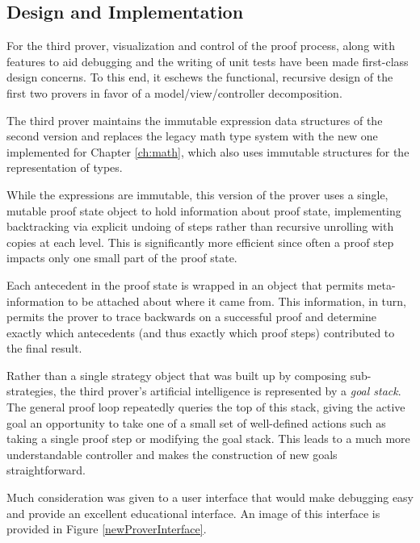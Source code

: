 	\subsection{Design and Implementation}	%

For the third prover, visualization and control of the proof process, along with features to aid debugging and the writing of unit tests have been made first-class design concerns.  To this end, it eschews the functional, recursive design of the first two provers in favor of a model/view/controller decomposition.

The third prover maintains the immutable expression data structures of the second version and replaces the legacy math type system with the new one implemented for Chapter \ref{ch:math}, which also uses immutable structures for the representation of types.

While the expressions are immutable, this version of the prover uses a single, mutable proof state object to hold information about proof state, implementing backtracking via explicit undoing of steps rather than recursive unrolling with copies at each level.  This is significantly more efficient since often a proof step impacts only one small part of the proof state.

Each antecedent in the proof state is wrapped in an object that permits meta-information to be attached about where it came from.  This information, in turn, permits the prover to trace backwards on a successful proof and determine exactly which antecedents (and thus exactly which proof steps) contributed to the final result.

Rather than a single strategy object that was built up by composing sub-strategies, the third prover's artificial intelligence is represented by a \emph{goal stack}.  The general proof loop repeatedly queries the top of this stack, giving the active goal an opportunity to take one of a small set of well-defined actions such as taking a single proof step or modifying the goal stack.  This leads to a much more understandable controller and makes the construction of new goals straightforward.

Much consideration was given to a user interface that would make debugging easy and provide an excellent educational interface.  An image of this interface is provided in Figure \ref{newProverInterface}.

